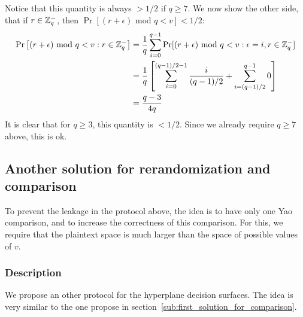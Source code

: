 \documentclass[11pt]{article}
\begin{document}

Notice that this quantity is always $> 1/2$ if $q \geq 7$. We now show the other side, that
if $r \in {\mathbb Z}_q^-$, then $\Pr\left[(r+\epsilon)\text{ mod }q<v\right] < 1/2$:
\begin{align*}
    \Pr\left[(r+\epsilon)\text{ mod }q<v:r\in{\mathbb Z}_q^-\right] &=
        \frac{1}{q}\sum\limits_{i=0}^{q-1}\Pr[(r+\epsilon)\text{ mod }q<v : \epsilon=i,r\in{\mathbb Z}_q^-] \\
        &= \frac{1}{q}\left[ \sum\limits_{i=0}^{(q-1)/2-1} \frac{i}{(q-1)/2} + \sum\limits_{i=(q-1)/2}^{q-1} 0 \right] \\
        &= \frac{q-3}{4q}
\end{align*}
It is clear that for $q \geq 3$, this quantity is $< 1/2$. Since we already
require $q \geq 7$ above, this is ok.






\subsection{Another solution for rerandomization and comparison}
           
           To prevent the leakage in the protocol above, the idea is to have only one Yao comparison, and to increase the correctness of this comparison. For this, we require that the plaintext space is much larger than the space of possible values of $v$. 
           
\subsubsection{Description} 
We propose an other protocol for the hyperplane decision surfaces. The idea is very similar to the one propose in section~\ref{sub:first_solution_for_comparison}.
\end{document}
